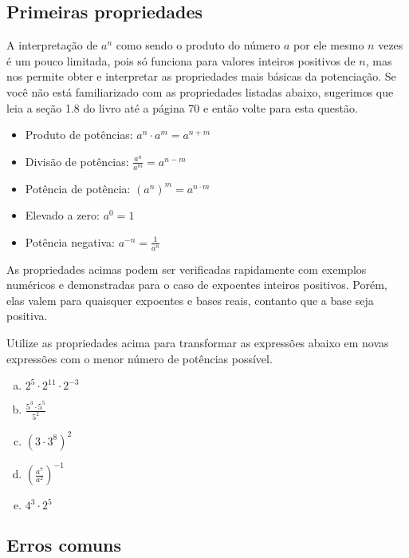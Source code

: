 \documentclass[main_estudante.tex]{subfiles}
\begin{document}
\subsection*{Primeiras propriedades}

A interpretação de $a^n$ como sendo o produto do número $a$ por ele mesmo $n$ vezes é um pouco limitada, pois só funciona para valores inteiros positivos de $n$, mas nos permite obter e interpretar as propriedades mais básicas da potenciação. Se você não está familiarizado com as propriedades listadas abaixo, sugerimos que leia a seção 1.8 do livro  até a página 70 e então volte para esta questão.

\begin{shaded*}
\begin{itemize}
 \item Produto de potências: $a^n \cdot a^m = a^{n+m}$
 \item Divisão de potências: $\frac{a^n}{a^m} = a^{n-m}$
 \item Potência de potência: $(a^n)^m = a^{n \cdot m}$
 \item Elevado a zero: $a^0 = 1$
 \item Potência negativa: $a^{-n} = \frac{1}{a^n}$
\end{itemize}
\end{shaded*}

As propriedades acimas podem ser verificadas rapidamente com exemplos numéricos e demonstradas para o caso de expoentes inteiros positivos. Porém, elas valem para quaisquer expoentes e bases reais, contanto que a base seja positiva.

\begin{questao}
Utilize as propriedades acima para transformar as expressões abaixo em novas expressões com o menor número de potências possível.
\begin{enumerate}[a)]
\item $2^5 \cdot 2^{11} \cdot 2^{-3}$
\item $\frac{5^3 \cdot 5^5}{5^2}$
\item $(3 \cdot 3^8)^2$
\item $(\frac{a^7}{a^2})^{-1}$
\item $4^3 \cdot 2^5$
\end{enumerate}
\end{questao}

\subsection*{Erros comuns}
\end{document}
